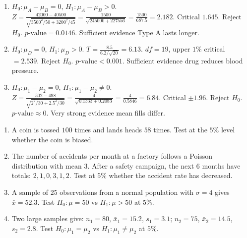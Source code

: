 \documentclass[11pt]{article}
\begin{document}
\begin{corrige}[Exercise 4]
\begin{enumerate}
\item $H_0 : \mu_A - \mu_B = 0$, $H_1 : \mu_A - \mu_B > 0$. $Z = \frac{42000-40500}{\sqrt{3500^2/50 + 3200^2/45}} = \frac{1500}{\sqrt{245000 + 227556}} = \frac{1500}{687.5} = 2.182$. Critical $1.645$. Reject $H_0$. $p\text{-value} = 0.0146$. Sufficient evidence Type A lasts longer.
\item $H_0 : \mu_D = 0$, $H_1 : \mu_D > 0$. $T = \frac{8.5}{6.2/\sqrt{20}} = 6.13$. $df=19$, upper $1\%$ critical $= 2.539$. Reject $H_0$. $p\text{-value} < 0.001$. Sufficient evidence drug reduces blood pressure.
\item $H_0 : \mu_1 - \mu_2 = 0$, $H_1 : \mu_1 - \mu_2 \neq 0$. $Z = \frac{502-498}{\sqrt{2^2/30 + 2.5^2/30}} = \frac{4}{\sqrt{0.1333 + 0.2083}} = \frac{4}{0.5846} = 6.84$. Critical $\pm 1.96$. Reject $H_0$. $p\text{-value} \approx 0$. Very strong evidence mean fills differ.
\end{enumerate}
\end{corrige}

\begin{exercice}
\begin{enumerate}
\item A coin is tossed $100$ times and lands heads $58$ times. Test at the $5\%$ level whether the coin is biased.
\item The number of accidents per month at a factory follows a Poisson distribution with mean $3$. After a safety campaign, the next $6$ months have totals: $2, 1, 0, 3, 1, 2$. Test at $5\%$ whether the accident rate has decreased.
\item A sample of $25$ observations from a normal population with $\sigma = 4$ gives $\bar{x} = 52.3$. Test $H_0 : \mu = 50$ vs $H_1 : \mu > 50$ at $5\%$.
\item Two large samples give: $n_1 = 80$, $\bar{x}_1 = 15.2$, $s_1 = 3.1$; $n_2 = 75$, $\bar{x}_2 = 14.5$, $s_2 = 2.8$. Test $H_0 : \mu_1 = \mu_2$ vs $H_1 : \mu_1 \neq \mu_2$ at $5\%$.
\end{enumerate}
\end{exercice}
\end{document}
